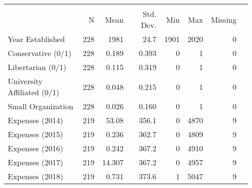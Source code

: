 \def\sym#1{\ifmmode^{#1}\else\(^{#1}\)\fi}
\setlength\tabcolsep{10pt}
\begin{tabular}{@{\extracolsep{-10pt}}l*{1}{rrrrrrr}}
\toprule
                              &\multicolumn{6}{c}{}                                                         \\
                              &     N&        Mean&      Std. Dev.&      Min&         Max&            Missing\\
\midrule
Year Established            &       228&       1981&        24.7&           1901&      2020&          0\\
Conservative (0/1)          &        228&    0.189&        0.393&            0&             1&        0\\
Libertarian (0/1)           &       228&       0.115&        0.319&           0&           1&        0\\
University Affiliated (0/1) &       228&       0.048&        0.215&           0&           1&        0\\
Small Organization          &       228&       0.026&        0.160&           0&           1&        0\\
Expenses (2014)             &       219&      53.08&      356.1&              0&           4870&        9\\
Expenses (2015)             &       219&       0.236&        362.7&           0&           4809&        9\\
Expenses (2016)             &       219&       0.242&        367.2&           0&           4910&        9\\
Expenses (2017)             &       219&      14.307&       367.2&           0&           4957&        9\\
Expenses (2018)             &       219&       0.731&        373.6&           1&           5047&         9\\
\bottomrule
\end{tabular}